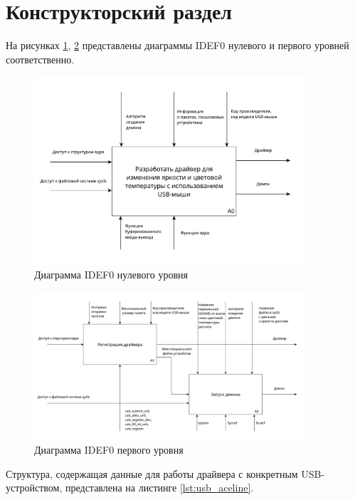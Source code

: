 \section{Конструкторский раздел}

На рисунках \ref{img:idef0_0}, \ref{img:idef0_1} представлены диаграммы IDEF0 нулевого и первого уровней соответственно.

\begin{figure}[!htb]\centering
	\includegraphics[width=0.9\textwidth]{../img/idef0_0.pdf}
	\caption{Диаграмма IDEF0 нулевого уровня}
	\label{img:idef0_0}
\end{figure}

\begin{figure}[!htb]\centering
	\includegraphics[width=0.9\textwidth]{../img/idef0_1.pdf}
	\caption{Диаграмма IDEF0 первого уровня}
	\label{img:idef0_1}
\end{figure}

\newpage

Структура, содержащая данные для работы драйвера с конкретным USB-устройством, представлена на листинге \ref{lst:usb_aceline}.


